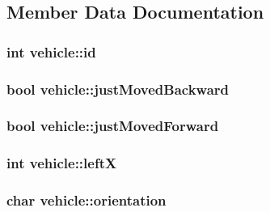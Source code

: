 \subsection{Member Data Documentation}
\hypertarget{classvehicle_aaeb2fbb86781433397e3cb4310c1fa0d}{
\subsubsection[{id}]{\setlength{\rightskip}{0pt plus 5cm}int vehicle\-::id}}\label{classvehicle_aaeb2fbb86781433397e3cb4310c1fa0d}
\hypertarget{classvehicle_a9d80854d25aa46fc90343e677ea9a13e}{
\subsubsection[{just\-Moved\-Backward}]{\setlength{\rightskip}{0pt plus 5cm}bool vehicle\-::just\-Moved\-Backward}}\label{classvehicle_a9d80854d25aa46fc90343e677ea9a13e}
\hypertarget{classvehicle_a78d0fa57fbe7f0554e8f8ca72caa3bc8}{
\subsubsection[{just\-Moved\-Forward}]{\setlength{\rightskip}{0pt plus 5cm}bool vehicle\-::just\-Moved\-Forward}}\label{classvehicle_a78d0fa57fbe7f0554e8f8ca72caa3bc8}
\hypertarget{classvehicle_a37846d9843132d09e8677bd73a941c54}{
\subsubsection[{left\-X}]{\setlength{\rightskip}{0pt plus 5cm}int vehicle\-::left\-X}}\label{classvehicle_a37846d9843132d09e8677bd73a941c54}
\hypertarget{classvehicle_a79550d470251103a9634b1393e83317d}{
\subsubsection[{orientation}]{\setlength{\rightskip}{0pt plus 5cm}char vehicle\-::orientation}}\label{classvehicle_a79550d470251103a9634b1393e83317d}
